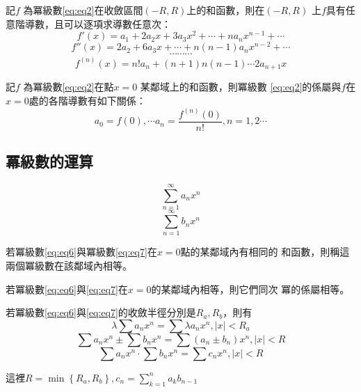 \documentclass[a4paper,12pt]{article}
\theoremstyle{theorem}
\begin{document}
\begin{CJK*}{UTF8}{bsmi}
\begin{corollary}
    記$f$ 為冪級數\ref{eq:eq2}在收斂區間$(-R, R)$上的和函數，則在$(-R, R)$
    上$f$具有任意階導數，且可以逐項求導數任意次：
    \[
        f'(x) = a_1 + 2a_2x + 3a_3x^2 + \cdots + na_nx^{n-1} + \cdots
    \]
    \[
        f''(x) = 2a_2 + 6a_3x + \cdots + n(n-1)a_nx^{n-2} + \cdots
    \]
    \[
        \cdots\cdots\cdots
    \]
    \[
        f^{(n)}(x) = n!a_n + (n+1)n(n-1)\cdots 2 a_{n+1}x
    \]
\end{corollary}
\begin{corollary}
    記$f$ 為冪級數\ref{eq:eq2}在點$x = 0$ 某鄰域上的和函數，則冪級數
    \ref{eq:eq2}的係屬與$f$在$x = 0$處的各階導數有如下關係：
    \[
        a_0 = f(0), \cdots a_n = \frac{f^{(n)}(0)}{n!}, n=1,2 \cdots
    \]
\end{corollary}

\subsection{冪級數的運算}
\begin{equation}
    \sum_{n=1}^{\infty}a_nx^n
    \label{eq:eq6}
\end{equation}
\begin{equation}
    \sum_{n=1}^{\infty}b_nx^n
    \label{eq:eq7}
\end{equation}

\begin{definition}
    若冪級數\ref{eq:eq6}與冪級數\ref{eq:eq7}在$x=0$點的某鄰域內有相同的
    和函數，則稱這兩個冪級數在該鄰域內相等。
\end{definition}

\begin{theorem}
    若冪級數\ref{eq:eq6}與\ref{eq:eq7}在$x = 0$的某鄰域內相等，則它們同次
    冪的係屬相等。
\end{theorem}

\begin{theorem}
    若冪級數\ref{eq:eq6}與\ref{eq:eq7}的收斂半徑分別是$R_a, R_b$，則有
    \[
        \lambda\sum a_n x^n = \sum \lambda a_nx^n, \vert x \vert < R_a
    \]
    \[
        \sum a_n x^n \pm \sum b_n x^n = \sum (a_n \pm b_n)x^n, \vert x \vert < R
    \]
    \[
        \sum a_n x^n \cdot \sum b_n x^n = \sum c_n x^n, \vert x \vert < R
    \]

    這裡$\displaystyle R = \min\left\{R_a, R_b\right\}, c_n = \sum_{k=1}^{n}a_k b_{n-1}$

\end{theorem}


\end{CJK*}
\end{document}
